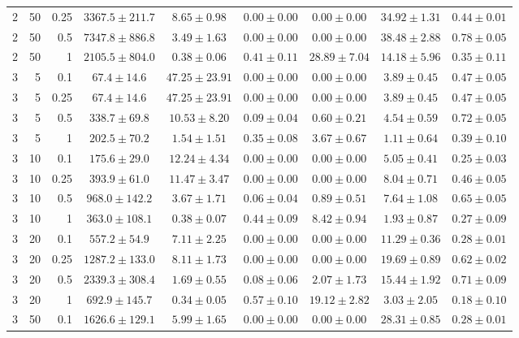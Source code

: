 \begin{table}[htbp]
\begin{tabular}{@{}rrrcccccc@{}}
2 & 50 & 0.25 & $3367.5 \pm 211.7$ & $8.65 \pm 0.98$ & $0.00 \pm 0.00$ & $0.00 \pm 0.00$ & $34.92 \pm 1.31$ & $0.44 \pm 0.01$ \\
2 & 50 & 0.5 & $7347.8 \pm 886.8$ & $3.49 \pm 1.63$ & $0.00 \pm 0.00$ & $0.00 \pm 0.00$ & $38.48 \pm 2.88$ & $0.78 \pm 0.05$ \\
2 & 50 & 1 & $2105.5 \pm 804.0$ & $0.38 \pm 0.06$ & $0.41 \pm 0.11$ & $28.89 \pm 7.04$ & $14.18 \pm 5.96$ & $0.35 \pm 0.11$ \\
\midrule
3 & 5 & 0.1 & $67.4 \pm 14.6$ & $47.25 \pm 23.91$ & $0.00 \pm 0.00$ & $0.00 \pm 0.00$ & $3.89 \pm 0.45$ & $0.47 \pm 0.05$ \\
3 & 5 & 0.25 & $67.4 \pm 14.6$ & $47.25 \pm 23.91$ & $0.00 \pm 0.00$ & $0.00 \pm 0.00$ & $3.89 \pm 0.45$ & $0.47 \pm 0.05$ \\
3 & 5 & 0.5 & $338.7 \pm 69.8$ & $10.53 \pm 8.20$ & $0.09 \pm 0.04$ & $0.60 \pm 0.21$ & $4.54 \pm 0.59$ & $0.72 \pm 0.05$ \\
3 & 5 & 1 & $202.5 \pm 70.2$ & $1.54 \pm 1.51$ & $0.35 \pm 0.08$ & $3.67 \pm 0.67$ & $1.11 \pm 0.64$ & $0.39 \pm 0.10$ \\
3 & 10 & 0.1 & $175.6 \pm 29.0$ & $12.24 \pm 4.34$ & $0.00 \pm 0.00$ & $0.00 \pm 0.00$ & $5.05 \pm 0.41$ & $0.25 \pm 0.03$ \\
3 & 10 & 0.25 & $393.9 \pm 61.0$ & $11.47 \pm 3.47$ & $0.00 \pm 0.00$ & $0.00 \pm 0.00$ & $8.04 \pm 0.71$ & $0.46 \pm 0.05$ \\
3 & 10 & 0.5 & $968.0 \pm 142.2$ & $3.67 \pm 1.71$ & $0.06 \pm 0.04$ & $0.89 \pm 0.51$ & $7.64 \pm 1.08$ & $0.65 \pm 0.05$ \\
3 & 10 & 1 & $363.0 \pm 108.1$ & $0.38 \pm 0.07$ & $0.44 \pm 0.09$ & $8.42 \pm 0.94$ & $1.93 \pm 0.87$ & $0.27 \pm 0.09$ \\
3 & 20 & 0.1 & $557.2 \pm 54.9$ & $7.11 \pm 2.25$ & $0.00 \pm 0.00$ & $0.00 \pm 0.00$ & $11.29 \pm 0.36$ & $0.28 \pm 0.01$ \\
3 & 20 & 0.25 & $1287.2 \pm 133.0$ & $8.11 \pm 1.73$ & $0.00 \pm 0.00$ & $0.00 \pm 0.00$ & $19.69 \pm 0.89$ & $0.62 \pm 0.02$ \\
3 & 20 & 0.5 & $2339.3 \pm 308.4$ & $1.69 \pm 0.55$ & $0.08 \pm 0.06$ & $2.07 \pm 1.73$ & $15.44 \pm 1.92$ & $0.71 \pm 0.09$ \\
3 & 20 & 1 & $692.9 \pm 145.7$ & $0.34 \pm 0.05$ & $0.57 \pm 0.10$ & $19.12 \pm 2.82$ & $3.03 \pm 2.05$ & $0.18 \pm 0.10$ \\
3 & 50 & 0.1 & $1626.6 \pm 129.1$ & $5.99 \pm 1.65$ & $0.00 \pm 0.00$ & $0.00 \pm 0.00$ & $28.31 \pm 0.85$ & $0.28 \pm 0.01$ \\

\end{tabular}
\end{table}
